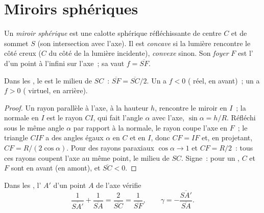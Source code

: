 \section{Miroirs sphériques}

\begin{definition}\label{def:b1:mirrors-thin-lenses:mirror}
Un \emph{miroir sphérique} est une calotte sphérique réfléchissante de
centre $C$ et de sommet $S$ (son intersection avec l'axe). Il est
\emph{concave} si la lumière rencontre le côté creux ($C$ du côté de la
lumière incidente), \emph{convexe} sinon. Son \emph{foyer} $F$ est
l' d'un point à l'infini sur l'axe~; sa  vaut
$f = \overline{SF}$.
\end{definition}

\begin{proposition}\label{prop:b1:mirrors-thin-lenses:focus}
Dans les , le  est le milieu de $SC$~:
$\overline{SF} = \overline{SC}/2$. Un  a $f < 0$ (
réel, en avant)~; un  a $f > 0$ ( virtuel, en
arrière).
\end{proposition}

\begin{proof}
Un rayon parallèle à l'axe, à la hauteur $h$, rencontre le miroir en
$I$~; la normale en $I$ est le rayon $CI$, qui fait l'angle $\alpha$
avec l'axe, $\sin\alpha = h/R$. Réfléchi sous le même angle $\alpha$ par
rapport à la normale, le rayon coupe l'axe en $F$~; le triangle $CIF$ a
des angles égaux $\alpha$ en $C$ et en $I$, donc $CF = IF$ et, en
projetant, $CF = R/(2\cos\alpha)$. Pour des rayons paraxiaux
$\cos\alpha \to 1$ et $CF = R/2$~: tous ces rayons coupent l'axe au même
point, le milieu de $SC$. Signe~: pour un , $C$ et $F$
sont en avant (en amont), et $\overline{SC} < 0$.
\end{proof}

\begin{theorem}\label{thm:b1:mirrors-thin-lenses:mirrorconj}
Dans les , l' $A'$ d'un point $A$ de l'axe
vérifie
\[
\frac{1}{\overline{SA'}} + \frac{1}{\overline{SA}} = \frac{2}{\overline{SC}}
= \frac{1}{\overline{SF}},
\qquad
\gamma = -\frac{\overline{SA'}}{\overline{SA}} .
\]
\end{theorem}

